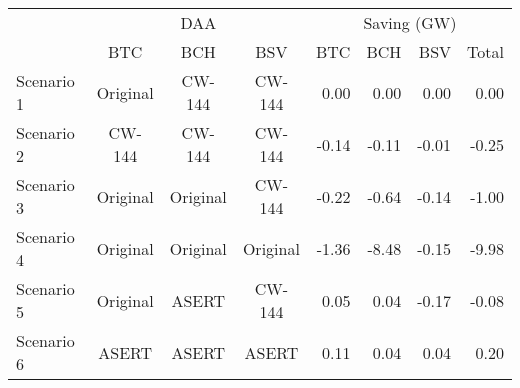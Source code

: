 
\begin{tabular}[t]{lcccrrrr}
\toprule
\multicolumn{1}{c}{ } & \multicolumn{3}{c}{DAA} & \multicolumn{4}{c}{Saving (GW)} \\
\cmidrule(l{3pt}r{3pt}){2-4} \cmidrule(l{3pt}r{3pt}){5-8}
 & BTC & BCH & BSV & BTC & BCH & BSV & Total\\
\midrule
Scenario 1 & Original & CW-144 & CW-144 & 0.00 & 0.00 & 0.00 & 0.00\\
Scenario 2 & CW-144 & CW-144 & CW-144 & -0.14 & -0.11 & -0.01 & -0.25\\
Scenario 3 & Original & Original & CW-144 & -0.22 & -0.64 & -0.14 & -1.00\\
Scenario 4 & Original & Original & Original & -1.36 & -8.48 & -0.15 & -9.98\\
Scenario 5 & Original & ASERT & CW-144 & 0.05 & 0.04 & -0.17 & -0.08\\
Scenario 6 & ASERT & ASERT & ASERT & 0.11 & 0.04 & 0.04 & 0.20\\
\bottomrule
\end{tabular}
